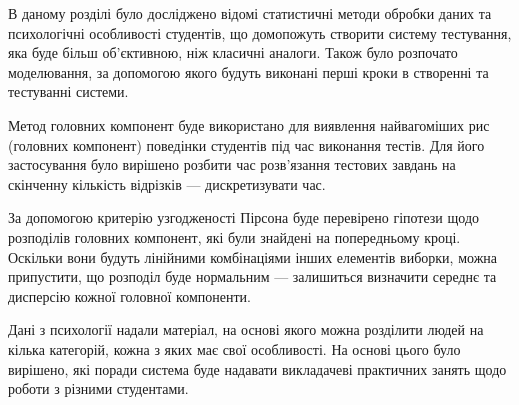 \chapterConclusion

В даному розділі було досліджено відомі статистичні методи обробки даних
та психологічні особливості студентів, що домопожуть створити систему
тестування, яка буде більш об’єктивною, ніж класичні аналоги.
Також було розпочато моделювання, за допомогою якого будуть виконані
перші кроки в створенні та тестуванні системи.

Метод головних компонент буде використано для виявлення найвагоміших
рис (головних компонент) поведінки студентів під час виконання тестів.
Для його застосування було вирішено розбити час розв’язання тестових завдань
на скінченну кількість відрізків --- дискретизувати час.

За допомогою критерію узгодженості Пірсона буде перевірено гіпотези щодо
розподілів головних компонент, які були знайдені на попередньому кроці.
Оскільки вони будуть лінійними комбінаціями інших елементів виборки, можна
припустити, що розподіл буде нормальним --- залишиться визначити середнє
та дисперсію кожної головної компоненти.

Дані з психології надали матеріал, на основі якого можна розділити людей
на кілька категорій, кожна з яких має свої особливості.
На основі цього було вирішено, які поради система буде надавати викладачеві
практичних занять щодо роботи з різними студентами.
